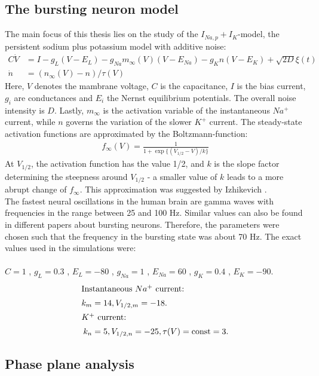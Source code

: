 \documentclass[12pt,a4paper]{article}
\begin{document}
\subsection{The bursting neuron model}
The main focus of this thesis lies on the study of the $I_{Na,p}+I_K$-model, the persistent sodium plus potassium model with additive noise:
\begin{align}\label{Veq}
C\dot{V} &= I - g_L(V-E_L) - g_{Na}m_{\infty}(V)(V-E_{Na}) - g_Kn(V-E_K)+\sqrt{2D}\xi(t)\\\label{neq}
\dot{n} &= (n_{\infty}(V)-n)/\tau(V)
\end{align}
Here, $V$ denotes the mambrane voltage, $C$ is the capacitance, $I$ is the bias current, $g_i$ are conductances and $E_i$ the Nernst equilibrium potentials. The overall noise intensity is $D$. Lastly, $m_{\infty}$ is the activation variable of the instantaneous $Na^+$ current, while $n$ governs the variation of the slower $K^+$ current. The steady-state activation functions are approximated by the Boltzmann-function:
\begin{align*}
f_{\infty}(V) = \frac{1}{1+\exp\{(V_{1/2}-V)/k\}}
\end{align*}
At $V_{1/2}$, the activation function has the value 1/2, and $k$ is the slope factor determining the steepness around $V_{1/2}$ - a smaller value of $k$ leads to a more abrupt change of $f_{\infty}$. This approximation was suggested by Izhikevich \cite{izi}.\\
The fastest neural oscillations in the human brain are gamma waves with frequencies in the range between 25 and 100 Hz\cite{gamma}\cite{gamma2}. Similar values can also be found in different papers about bursting neurons\cite{burstneu}\cite{burstneu2}. Therefore, the parameters were chosen such that the frequency in the bursting state was about 70 Hz.
The exact values used in the simulations were:\\\\
$C=1$ , $g_L=0.3$ , $E_L=-80$ , $g_{Na}=1$ , $E_{Na}=60$ , $g_K=0.4$ , $E_K=-90$.
\begin{align*}
\intertext{Instantaneous $Na^+$ current:} k_m&=14 , V_{1/2,m}=-18. 
\\
\intertext{$K^+$ current:} k_n&=5 , V_{1/2,n}=-25 , \tau(V)=\text{const}=3.
\end{align*}
\subsection{Phase plane analysis}
\end{document}
